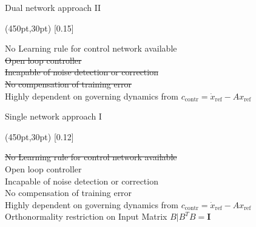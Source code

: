 \documentclass[17pt, t, lualatex]{beamer}
\begin{document}
\begin{frame}{Dual network approach II}
	\begin{textblock*}{50pt}(450pt,30pt)
		\scalebox{0.15}[0.15]{
		}
	\end{textblock*}
	No Learning rule for control network available\\
	\st{Open loop controller}\\
	\st{Incapable of noise detection or correction}\\
	\st{No compensation of training error}\\
	Highly dependent on governing dynamics from $c_{\text{contr}} = \dot{x}_{\text{ref}}-Ax_{\text{ref}}$\\
\end{frame}

\begin{frame}{Single network approach I}
	\begin{textblock*}{50pt}(450pt,30pt)
		\scalebox{0.12}[0.12]{
		}
	\end{textblock*}
	\st{No Learning rule for control network available}\\
	Open loop controller\\
	Incapable of noise detection or correction\\
	No compensation of training error\\
	Highly dependent on governing dynamics from $c_{\text{contr}} = \dot{x}_{\text{ref}}-Ax_{\text{ref}}$\\
	Orthonormality restriction on Input Matrix $B | B^TB = \mathbf{I}$
\end{frame}
\end{document}
